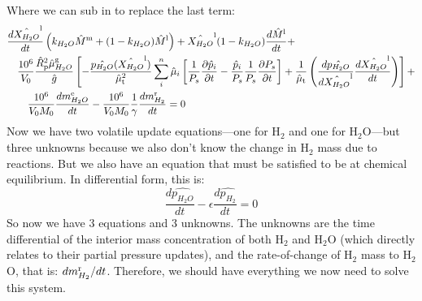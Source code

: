 Where we can sub in to replace the last term:
\begin{align}
&\frac{d \hat{X_{H_2O}}^{\rm l}}{d t} \left(k_{H_2O} \hat{M}^{\rm m} + (1-k_{H_2O}) \hat{M}^{\rm l} \right)
+ \hat{X_{H_2O}}^{\rm l} (1-k_{H_2O}) \frac{d \hat{M}^{\rm l}}{d t} + \nonumber \\
&\quad \frac{10^6}{V_0} \frac{\hat{R}_{\rm p}^2 \hat{\mu}_{H_2O}^{\rm g}}{\hat{g}}
\left[
-\frac{\hat{p_{H_2O}}(\hat{X_{H_2O}}^{\rm l})}{\hat{\mu}_{\rm t}^2} \sum_i^n \hat{\mu}_i \left[ \frac{1}{P_s} \frac{\partial \hat{p}_i}{\partial t} - \frac{\hat{p}_i}{P_s} \frac{1}{P_s} \frac{\partial P_s}{\partial t} \right] + \frac{1}{\hat{\mu}_{\rm t}} \left( \frac{d \hat{p_{H_2O}}}{d \hat{X_{H_2O}}^{\rm l}} \frac{d \hat{X_{H_2O}}^{\rm l}}{d t} \right)
\right]+ \nonumber \\
& \qquad \frac{10^6}{V_0 M_0} \frac{dm_{H_2O}^{\rm e}}{dt} - \frac{10^6}{V_0 M_0} \frac{1}{\gamma} \frac{dm_{H_2}^{\rm r}}{dt} = 0
\end{align}
Now we have two volatile update equations---one for H$_2$ and one for H$_2$O---but three unknowns because we also don't know the change in H$_2$ mass due to reactions.  But we also have an equation that must be satisfied to be at chemical equilibrium.  In differential form, this is:
\begin{equation}
\frac{d\hat{p_{H_2O}}}{dt} - \epsilon \frac{d\hat{p_{H_2}}}{dt} = 0
\end{equation}
So now we have 3 equations and 3 unknowns.  The unknowns are the time differential of the interior mass concentration of both H$_2$ and H$_2$O (which directly relates to their partial pressure updates), and the rate-of-change of H$_2$ mass to H$_2$O, that is: $dm^{\rm r}_{H_2}/dt$.  Therefore, we should have everything we now need to solve this system.
